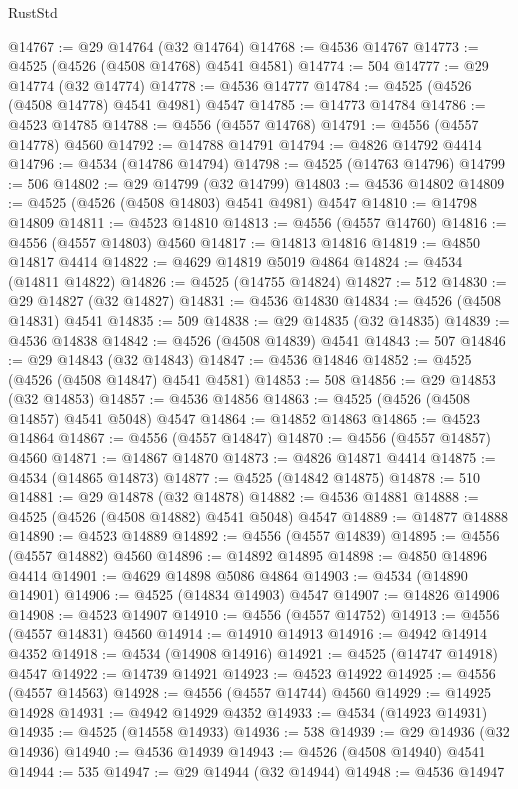 \begin{lexlean}{RustStd}
\begin{coremodule}
{\begin{coremodule}
{{{{{{{{{{{{{{{{{{{{{{{{{{{{{{{{{{{{{{{{{{{{{{{{{{{{{{{@14767 := @29 @14764 (@32 @14764)
@14768 := @4536 @14767
@14773 := @4525 (@4526 (@4508 @14768) @4541 @4581)
@14774 := 504
@14777 := @29 @14774 (@32 @14774)
@14778 := @4536 @14777
@14784 := @4525 (@4526 (@4508 @14778) @4541 @4981) @4547
@14785 := @14773 @14784
@14786 := @4523 @14785
@14788 := @4556 (@4557 @14768)
@14791 := @4556 (@4557 @14778) @4560
@14792 := @14788 @14791
@14794 := @4826 @14792 @4414
@14796 := @4534 (@14786 @14794)
@14798 := @4525 (@14763 @14796)
@14799 := 506
@14802 := @29 @14799 (@32 @14799)
@14803 := @4536 @14802
@14809 := @4525 (@4526 (@4508 @14803) @4541 @4981) @4547
@14810 := @14798 @14809
@14811 := @4523 @14810
@14813 := @4556 (@4557 @14760)
@14816 := @4556 (@4557 @14803) @4560
@14817 := @14813 @14816
@14819 := @4850 @14817 @4414
@14822 := @4629 @14819 @5019 @4864
@14824 := @4534 (@14811 @14822)
@14826 := @4525 (@14755 @14824)
@14827 := 512
@14830 := @29 @14827 (@32 @14827)
@14831 := @4536 @14830
@14834 := @4526 (@4508 @14831) @4541
@14835 := 509
@14838 := @29 @14835 (@32 @14835)
@14839 := @4536 @14838
@14842 := @4526 (@4508 @14839) @4541
@14843 := 507
@14846 := @29 @14843 (@32 @14843)
@14847 := @4536 @14846
@14852 := @4525 (@4526 (@4508 @14847) @4541 @4581)
@14853 := 508
@14856 := @29 @14853 (@32 @14853)
@14857 := @4536 @14856
@14863 := @4525 (@4526 (@4508 @14857) @4541 @5048) @4547
@14864 := @14852 @14863
@14865 := @4523 @14864
@14867 := @4556 (@4557 @14847)
@14870 := @4556 (@4557 @14857) @4560
@14871 := @14867 @14870
@14873 := @4826 @14871 @4414
@14875 := @4534 (@14865 @14873)
@14877 := @4525 (@14842 @14875)
@14878 := 510
@14881 := @29 @14878 (@32 @14878)
@14882 := @4536 @14881
@14888 := @4525 (@4526 (@4508 @14882) @4541 @5048) @4547
@14889 := @14877 @14888
@14890 := @4523 @14889
@14892 := @4556 (@4557 @14839)
@14895 := @4556 (@4557 @14882) @4560
@14896 := @14892 @14895
@14898 := @4850 @14896 @4414
@14901 := @4629 @14898 @5086 @4864
@14903 := @4534 (@14890 @14901)
@14906 := @4525 (@14834 @14903) @4547
@14907 := @14826 @14906
@14908 := @4523 @14907
@14910 := @4556 (@4557 @14752)
@14913 := @4556 (@4557 @14831) @4560
@14914 := @14910 @14913
@14916 := @4942 @14914 @4352
@14918 := @4534 (@14908 @14916)
@14921 := @4525 (@14747 @14918) @4547
@14922 := @14739 @14921
@14923 := @4523 @14922
@14925 := @4556 (@4557 @14563)
@14928 := @4556 (@4557 @14744) @4560
@14929 := @14925 @14928
@14931 := @4942 @14929 @4352
@14933 := @4534 (@14923 @14931)
@14935 := @4525 (@14558 @14933)
@14936 := 538
@14939 := @29 @14936 (@32 @14936)
@14940 := @4536 @14939
@14943 := @4526 (@4508 @14940) @4541
@14944 := 535
@14947 := @29 @14944 (@32 @14944)
@14948 := @4536 @14947
}}}}}}}}}}}}}}}}}}}}}}}}}}}}}}}}}}}}}}}}}}}}}}}}}}}}}}}
\end{coremodule}}
\end{coremodule}
\end{lexlean}
